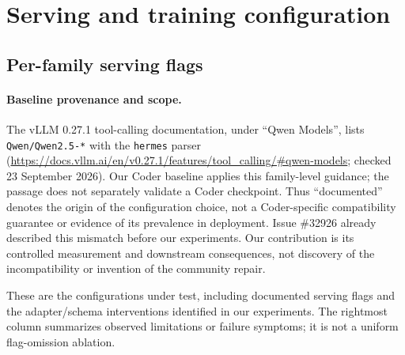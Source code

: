 \section{Serving and training configuration}
\label{app:config}

\subsection{Per-family serving flags}

\paragraph{Baseline provenance and scope.}
The vLLM 0.27.1 tool-calling documentation, under ``Qwen Models'', lists
\texttt{Qwen/Qwen2.5-*} with the \texttt{hermes} parser
(\url{https://docs.vllm.ai/en/v0.27.1/features/tool_calling/#qwen-models};
checked 23 September 2026). Our Coder baseline applies this family-level guidance;
the passage does not separately validate a Coder checkpoint. Thus ``documented'' denotes
the origin of the configuration choice, not a Coder-specific compatibility guarantee or
evidence of its prevalence in deployment. Issue \#32926 already described this mismatch
before our experiments. Our contribution is its controlled measurement and downstream
consequences, not discovery of the incompatibility or invention of the community repair.

These are the configurations under test, including documented serving flags and the
adapter/schema interventions identified in our experiments. The rightmost column summarizes
observed limitations or failure symptoms; it is not a uniform flag-omission ablation.

